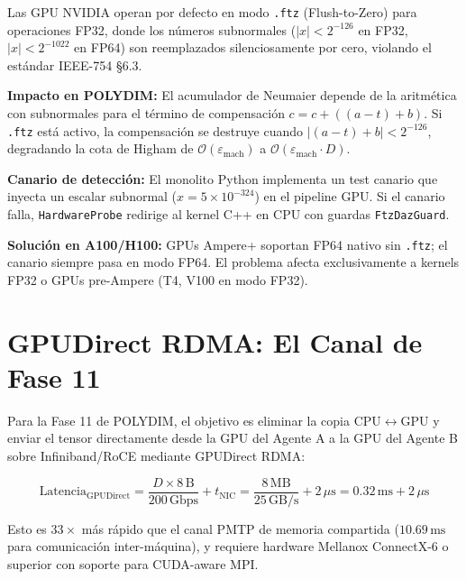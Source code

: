 \begin{remark}

Las GPU NVIDIA operan por defecto en modo \texttt{.ftz} (Flush-to-Zero)
para operaciones FP32, donde los números subnormales 
($|x| < 2^{-126}$ en FP32, $|x| < 2^{-1022}$ en FP64) son reemplazados
silenciosamente por cero, violando el estándar IEEE-754 §6.3.

\textbf{Impacto en POLYDIM:} El acumulador de Neumaier depende de la
aritmética con subnormales para el término de compensación 
$c = c + ((a - t) + b)$. Si \texttt{.ftz} está activo, la compensación
se destruye cuando $|(a - t) + b| < 2^{-126}$, degradando la cota de
Higham de $\mathcal{O}(\varepsilon_{\text{mach}})$ a 
$\mathcal{O}(\varepsilon_{\text{mach}} \cdot D)$.

\textbf{Canario de detección:} El monolito Python implementa un test
canario que inyecta un escalar subnormal ($x = 5 \times 10^{-324}$) 
en el pipeline GPU. Si el canario falla, \texttt{HardwareProbe} redirige
al kernel C++ en CPU con guardas \texttt{FtzDazGuard}.

\textbf{Solución en A100/H100:} GPUs Ampere+ soportan FP64 nativo sin
\texttt{.ftz}; el canario siempre pasa en modo FP64. El problema afecta
exclusivamente a kernels FP32 o GPUs pre-Ampere (T4, V100 en modo FP32).
\end{remark}

\section{GPUDirect RDMA: El Canal de Fase 11}

Para la Fase 11 de POLYDIM, el objetivo es eliminar la copia CPU$\leftrightarrow$GPU
y enviar el tensor directamente desde la GPU del Agente A a la GPU del Agente B
sobre Infiniband/RoCE mediante GPUDirect RDMA:

\begin{equation}
\text{Latencia}_{\text{GPUDirect}} = \frac{D \times 8\,\text{B}}{200\,\text{Gbps}} + t_{\text{NIC}}
= \frac{8\,\text{MB}}{25\,\text{GB/s}} + 2\,\mu\text{s} = 0.32\,\text{ms} + 2\,\mu\text{s}
\end{equation}

Esto es $33\times$ más rápido que el canal PMTP de memoria compartida
($10.69\,\text{ms}$ para comunicación inter-máquina), y requiere hardware Mellanox
ConnectX-6 o superior con soporte para CUDA-aware MPI.

